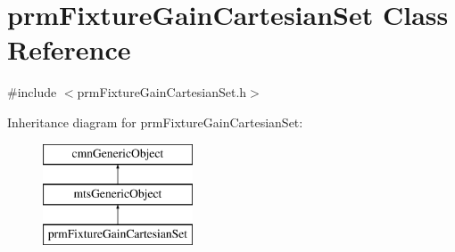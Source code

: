 \hypertarget{classprm_fixture_gain_cartesian_set}{}\section{prm\+Fixture\+Gain\+Cartesian\+Set Class Reference}
\label{classprm_fixture_gain_cartesian_set}


{\ttfamily \#include $<$prm\+Fixture\+Gain\+Cartesian\+Set.\+h$>$}

Inheritance diagram for prm\+Fixture\+Gain\+Cartesian\+Set\+:\begin{figure}[H]
\begin{center}
\leavevmode
\includegraphics[height=3.000000cm]{d7/de4/classprm_fixture_gain_cartesian_set}
\end{center}
\end{figure}
